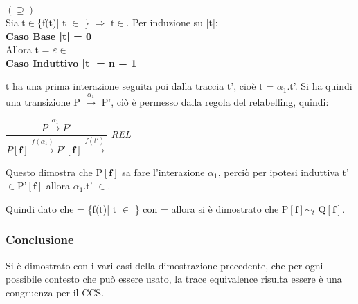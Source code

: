 $(\supseteq)$ \\

Sia t$\in$\{f(t)| t $\in$ \}  $\Rightarrow$ t$\in$. Per induzione su |t|:\\

\textbf{Caso Base |t| = 0}
\\
Allora t = $\varepsilon \in$
\\

\textbf{Caso Induttivo |t| = n + 1}

t ha una prima interazione seguita poi dalla traccia t', cioè t = $\alpha_{1}$.t'. Si ha quindi una transizione P $\overset{\alpha_{1}}\rightarrow$ P', ciò è permesso dalla regola del relabelling, quindi:

$\dfrac{P \overset{\alpha_{1}}\rightarrow P'}{P \mathbf{[f]} \overset{f(\alpha_{1})}\rightarrow P'\mathbf{[f]}\overset{f(t')}\rightarrow}$ \textit{REL} 

Questo dimostra che P$\mathbf{[f]}$ sa fare l'interazione $\alpha_{1}$, perciò per ipotesi induttiva t'$\in$P'$\mathbf{[f]}$ allora $\alpha_{1}$.t' $\in$.

Quindi dato che  = \{f(t)| t $\in$ \} con  =  allora si è dimostrato che  P$\mathbf{[f]}\sim_{t}$ Q$\mathbf{[f]}$.

\subsubsection{Conclusione}
Si è dimostrato con i vari casi della dimostrazione precedente, che per ogni possibile contesto che può essere usato, la trace equivalence risulta essere è una congruenza per il CCS. 